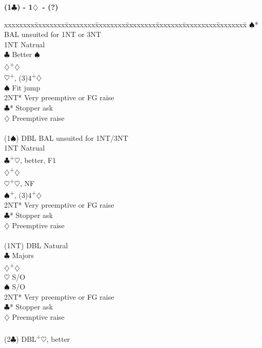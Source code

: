 \documentclass[10pt]{article}
\renewcommand{\c}{$\clubsuit$}
\renewcommand{\d}{$\diamondsuit$}
\newcommand{\h}{$\heartsuit$}
\newcommand{\s}{$\spadesuit$}
\newcommand{\p}{\textsuperscript{+}}
\newcommand{\x}{DBL}
\newenvironment{bidtable}[1][]
{\textbf{#1}
  \begin{adjustwidth}{1em}{}
    \addvspace{2pt}
    \begin{tabbing}
      xxxxxxxx\=xxxxxxxx\=xxxxxxxx\=xxxxxxxx\=xxxxxxxx\=xxxxxxx\=xxxxxxxxx\=xxxxxxxx\=\kill}
{\end{tabbing}\end{adjustwidth}\bigskip}%
\begin{document}
\begin{bidtable}[(1\c) - 1\d\ - (?)]
       \s* \> BAL unsuited for 1NT or 3NT \\
       \> 1NT  \> Natrual                     \\
       \c  \> Better \s                   \\
       \d  {}\p\d                       \\
       \h  {}\p, (3)4\p\d               \\
       \s  \> Fit jump                    \\
       \> 2NT* \> Very preemptive or FG raise \\
       \c* \> Stopper ask                 \\
       \d  \> Preemptive raise            \\
                                              \\
(1\s)  \> \x   \> BAL unsuited for 1NT/3NT    \\
       \> 1NT  \> Natrual                     \\
       \c  {}\p\h, better, F1           \\
       \d  {}\p\d                       \\
       \h  {}\p\h, NF                   \\
       \s  {}\p, (3)4\p\d               \\
       \> 2NT* \> Very preemptive or FG raise \\
       \c* \> Stopper ask                 \\
       \d  \> Preemptive raise            \\
                                              \\
(1NT)  \> \x   \> Natural                     \\
       \c  \> Majors                      \\
       \d  {}\p\d                       \\
       \h  \> S/O                         \\
       \s  \> S/O                         \\
       \> 2NT* \> Very preemptive or FG raise \\
       \c* \> Stopper ask                 \\
       \d  \> Preemptive raise            \\
                                              \\
(2\c)  \> \x   {}\p\h, better               \\

\end{bidtable}
\end{document}
